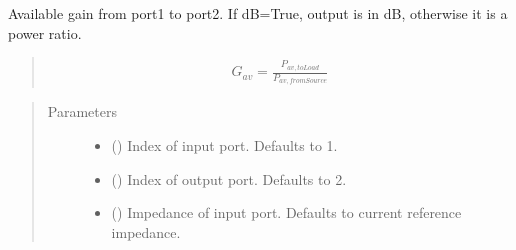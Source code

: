 \documentclass[letterpaper,10pt,english]{sphinxmanual}
\begin{document}
\begin{fulllineitems}

\begin{fulllineitems}
\label{\detokenize{touchstone:touchstone.spfile.dosyayi_tekrar_oku}}
\end{fulllineitems}


\begin{fulllineitems}
\label{\detokenize{touchstone:touchstone.spfile.gav}}
Available gain from port1 to port2. If dB=True, output is in dB, otherwise it is a power ratio.
\begin{quote}
\begin{equation*}
\begin{split}G_{av}=\frac{P_{av,toLoad}}{P_{av,fromSource}}\end{split}
\end{equation*}\end{quote}
\begin{quote}\begin{description}
\item[{Parameters}] \leavevmode\begin{itemize}
\item {} 
 (\sphinxstyleliteralemphasis{\sphinxupquote{, }}) \textendash{} Index of input port. Defaults to 1.

\item {} 
 (\sphinxstyleliteralemphasis{\sphinxupquote{, }}) \textendash{} Index of output port. Defaults to 2.

\item {} 
 (\sphinxstyleliteralemphasis{\sphinxupquote{, }}) \textendash{} Impedance of input port. Defaults to current reference impedance.


\end{itemize}
\end{description}
\end{quote}
\end{fulllineitems}
\end{fulllineitems}
\end{document}
